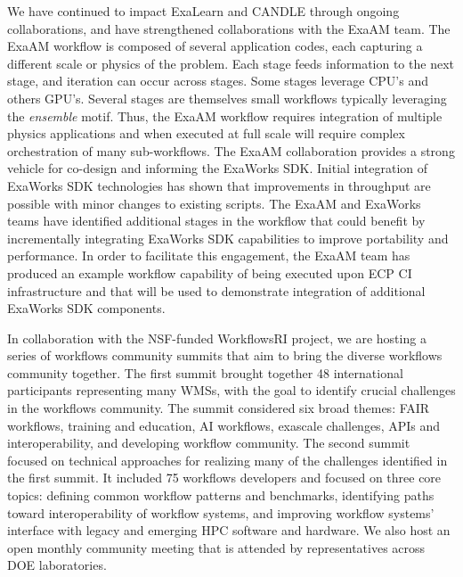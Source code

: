We have continued to impact ExaLearn and CANDLE through ongoing
collaborations, and have strengthened collaborations with the ExaAM team. The
ExaAM workflow is composed of several application codes, each capturing a
different scale or physics of the problem.  Each stage feeds
information to the next stage, and iteration can occur across stages.  Some
stages leverage CPU's and others GPU's. Several stages are themselves small
workflows typically leveraging the \textit{ensemble} motif. Thus, the ExaAM
workflow requires integration of multiple physics applications and when
executed at full scale will require complex orchestration of many
sub-workflows.  The ExaAM collaboration provides a strong vehicle for co-design and informing the 
ExaWorks SDK. Initial integration of ExaWorks SDK technologies has shown that
improvements in throughput are possible with minor changes to existing scripts.
The ExaAM and ExaWorks teams have identified additional stages in the workflow
that could benefit by incrementally integrating ExaWorks SDK capabilities to
improve portability and performance.  In order to facilitate this engagement,
the ExaAM team has produced an example workflow capability of being executed
upon ECP CI infrastructure and that will be used to demonstrate integration of additional
ExaWorks SDK components.

In collaboration with the NSF-funded WorkflowsRI project, we are hosting
a series of workflows community summits that aim to bring the diverse
workflows community together. 
The first summit brought together 48 international participants representing many WMSs, 
with the goal to identify crucial challenges in the workflows community. 
The summit considered six broad themes: FAIR workflows, training and education,
AI workflows, exascale challenges, APIs and interoperability, and developing workflow community. 
The second summit~\cite{summit_2} focused on technical approaches for realizing 
many of the challenges identified in the first summit. It included 75 workflows developers %
and focused on three core topics: 
defining common workflow patterns and benchmarks, identifying paths toward interoperability of workflow systems, and improving workflow systems’ interface with legacy and emerging HPC software and hardware.
We also host an open monthly community meeting that is attended by representatives across
DOE laboratories.



